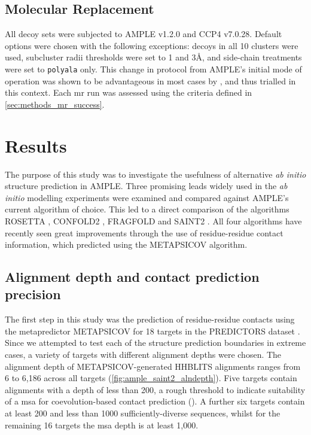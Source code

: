 \subsection{Molecular Replacement}
All decoy sets were subjected to AMPLE v1.2.0 and CCP4 v7.0.28. Default options were chosen with the following exceptions: decoys in all 10 clusters were used, subcluster radii thresholds were set to 1 and 3\AA, and side-chain treatments were set to \texttt{polyala} only. This change in protocol from AMPLE's initial mode of operation \cite{Bibby2012-lm} was shown to be advantageous in most cases by \textcite{Thomas2017-qu}, and thus trialled in this context.  Each \gls{mr} run was assessed using the criteria defined in \cref{sec:methods_mr_success}.

\section{Results}
The purpose of this study was to investigate the usefulness of alternative \textit{ab initio} structure prediction in AMPLE. Three promising leads widely used in the \textit{ab initio} modelling experiments were examined and compared against AMPLE's current algorithm of choice. This led to a direct comparison of the algorithms ROSETTA \cite{Rohl2004-dj}, CONFOLD2 \cite{Adhikari2018-lj}, FRAGFOLD \cite{Jones2001-mc} and SAINT2 \cite{De_Oliveira2017-sg}. All four algorithms have recently seen great improvements through the use of residue-residue contact information, which predicted using the METAPSICOV \cite{Jones2015-vq} algorithm.

\subsection{Alignment depth and contact prediction precision}
The first step in this study was the prediction of residue-residue contacts using the metapredictor METAPSICOV for 18 targets in the PREDICTORS dataset \cite{Jones2015-vq}. Since we attempted to test each of the structure prediction boundaries in extreme cases, a variety of targets with different alignment depths were chosen. The alignment depth of METAPSICOV-generated HHBLITS alignments ranges from 6 to 6,186 across all targets (\cref{fig:ample_saint2_alndepth}). Five targets contain alignments with a depth of less than 200, a rough threshold to indicate suitability of a \gls{msa} for coevolution-based contact prediction (\cite{Simkovic2017-xs}). A further six targets contain at least 200 and less than 1000 sufficiently-diverse sequences, whilst for the remaining 16 targets the \gls{msa} depth is at least 1,000.

